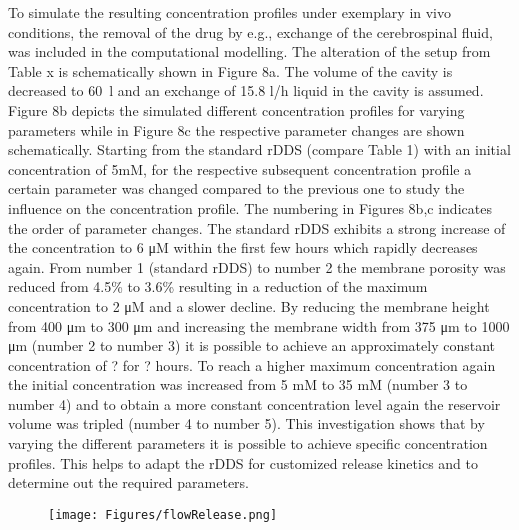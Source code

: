 \documentclass{article}
\begin{document}
  To simulate the resulting concentration profiles under exemplary in vivo conditions, the removal of the drug by e.g., exchange of the cerebrospinal fluid, was included in the computational modelling. The alteration of the setup from Table x is schematically shown in Figure 8a. The volume of the cavity is decreased to 60~\textmu l and an exchange of 15.8 \textmu l/h liquid in the cavity is assumed. Figure 8b depicts the simulated different concentration profiles for varying parameters while in Figure 8c the respective parameter changes are shown schematically. Starting from the standard rDDS (compare Table 1) with an initial concentration of 5mM, for the respective subsequent concentration profile a certain parameter was changed compared to the previous one to study the influence on the concentration profile. The numbering in Figures 8b,c indicates the order of parameter changes. The standard rDDS exhibits a strong increase of the concentration to 6 μM within the first few hours which rapidly decreases again. From number 1 (standard rDDS) to number 2 the membrane porosity was reduced from 4.5\% to 3.6\% resulting in a reduction of the maximum concentration to 2 μM and a slower decline. By reducing the membrane height from 400 μm to 300 μm and increasing the membrane width from 375 μm to 1000 μm (number 2 to number 3) it is possible to achieve an approximately constant concentration of ? for ? hours. To reach a higher maximum concentration again the initial concentration was increased from 5 mM to 35 mM (number 3 to number 4) and to obtain a more constant concentration level again the reservoir volume was tripled (number 4 to number 5). This investigation shows that by varying the different parameters it is possible to achieve specific concentration profiles. This helps to adapt the rDDS for customized release kinetics and to determine out the required parameters. 

  \begin{figure}
    \centering
    \texttt{[image: Figures/flowRelease.png]}
  \end{figure}

\end{document}
